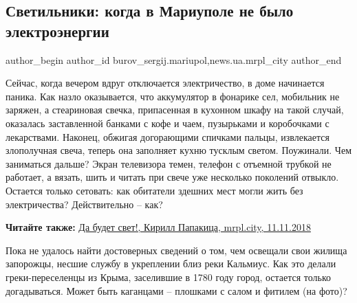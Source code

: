  
 
 
 
 
 
\subsection{Светильники: когда в Мариуполе не было электроэнергии}
\label{sec:08_12_2018.stz.news.ua.mrpl_city.1.svetilniki}
 
\ifcmt
 author_begin
   author_id burov_sergij.mariupol,news.ua.mrpl_city
 author_end
\fi


Сейчас, когда вечером вдруг отключается электричество, в доме начинается
паника. Как назло оказывается, что аккумулятор в фонарике сел, мобильник не
заряжен, а стеариновая свечка, припасенная в кухонном шкафу на такой случай,
оказалась заставленной банками с кофе и чаем, пузырьками и коробочками с
лекарствами. Наконец, обжигая догорающими спичками пальцы, извлекается
злополучная свеча, теперь она заполняет кухню тусклым светом. Поужинали. Чем
заниматься дальше? Экран телевизора темен, телефон с отъемной трубкой не
работает, а вязать, шить и читать при свече уже несколько поколений отвыкло.
Остается только сетовать: как обитатели здешних мест могли жить без
электричества? Действительно – как?

\textbf{Читайте также:} \href{https://mrpl.city/blogs/view/da-budet-svet}{Да будет свет!, Кирилл Папакица, mrpl.city, 11.11.2018}


Пока не удалось найти достоверных сведений о том, чем освещали свои жилища
запорожцы, несшие службу в укреплении близ реки Кальмиус. Как это делали
греки-переселенцы из Крыма, заселившие в 1780 году город, остается только
догадываться. Может быть каганцами – плошками с салом и фитилем (на фото)?

